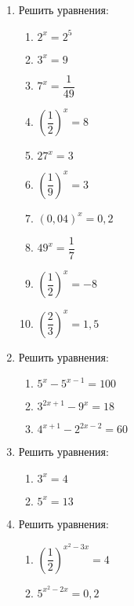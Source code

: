 \documentclass[12pt, a4paper]{article}
\begin{document}
	
   \cfoot{}
\begin{enumerate}
	\item Решить уравнения:
	\begin{multicols}{3}
		\begin{enumerate}[label=\textbf{\arabic*)}]
			\item $2^x=2^5$
			\item $3^x=9$
			\item $7^x=\dfrac{1}{49}$
			\item $\left(\dfrac{1}{2}\right)^x=8$
			\item $27^x=3$
			\item $\left(\dfrac{1}{9}\right)^x=3$
			\item $(0,04)^x=0,2$
			\item $49^x=\dfrac{1}{7}$
			\item $\left(\dfrac{1}{2}\right)^x=-8$
			\item $\left(\dfrac{2}{3}\right)^x=1,5$
		\end{enumerate}
	\end{multicols}
	\item Решить уравнения:
	\begin{multicols}{3}
		\begin{enumerate}[label=\textbf{\arabic*)}]
			\item $5^x-5^{x-1}=100$
			\item $3^{2x+1}-9^x=18$
			\item $4^{x+1}-2^{2x-2}=60$
		\end{enumerate}
	\end{multicols}
	\item Решить уравнения:
	\begin{multicols}{2}
		\begin{enumerate}[label=\textbf{\arabic*)}]
			\item $3^x=4$
			\item $5^x=13$
		\end{enumerate}
	\end{multicols}
	\item Решить уравнения:
	\begin{multicols}{2}
		\begin{enumerate}[label=\textbf{\arabic*)}]
			\item $\left(\dfrac{1}{2}\right)^{x^2-3x}=4$
			\item $5^{x^2-2x}=0,2$
		\end{enumerate}
	\end{multicols}

\end{enumerate}
\end{document}
